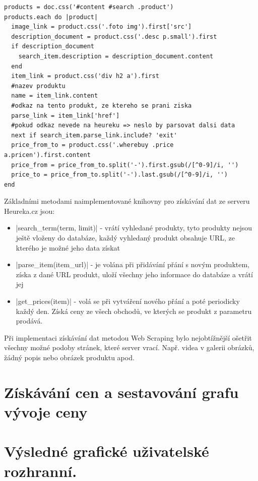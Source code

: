 \begin{lstlisting}
products = doc.css('#content #search .product')
products.each do |product|
  image_link = product.css('.foto img').first['src']
  description_document = product.css('.desc p.small').first
  if description_document
    search_item.description = description_document.content
  end
  item_link = product.css('div h2 a').first
  #nazev produktu
  name = item_link.content
  #odkaz na tento produkt, ze ktereho se prani ziska
  parse_link = item_link['href']
  #pokud odkaz nevede na heureku => neslo by parsovat dalsi data
  next if search_item.parse_link.include? 'exit'
  price_from_to = product.css('.wherebuy .price a.pricen').first.content
  price_from = price_from_to.split('-').first.gsub(/[^0-9]/i, '')
  price_to = price_from_to.split('-').last.gsub(/[^0-9]/i, '')
end
\end{lstlisting}

Základními metodami naimplementované knihovny pro získávání dat ze serveru Heureka.cz jsou:

\begin{itemize}
\item |search_term(term, limit)| - vrátí vyhledané produkty, tyto produkty nejsou ještě vloženy do databáze, každý vyhledaný produkt obsahuje URL, ze kterého je možné jeho data získat
\item |parse_item(item_url)| - je volána při přidávání přání s novým produktem, získa z dané URL produkt, uloží všechny jeho informace do databáze a vrátí jej
\item |get_prices(item)| - volá se při vytváření nového přání a poté periodicky každý den. Získá ceny ze všech obchodů, ve kterých se produkt z parametru prodává.
\end{itemize}

Při implementaci získávání dat metodou Web Scraping bylo nejobtížnější ošetřit všechny možné podoby stránek, které server vrací. Např. videa v galerii obrázků, žádný popis nebo obrázek produktu apod.

\section{Získávání cen a sestavování grafu vývoje ceny}

\section{Výsledné grafické uživatelské rozhranní.}